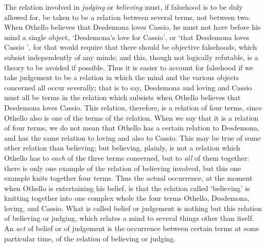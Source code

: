 \documentclass[oneside,letterpaper,12pt]{book}
\begin{document}
The relation involved in \emph{judging} or \emph{believing} must, if
falsehood is to be duly allowed for, be taken to be a relation between
several terms, not between two. When Othello believes that Desdemona
loves Cassio, he must not have before his mind a single object,
`Desdemona's love for
Cassio', or `that Desdemona loves Cassio
', for that would require that there should be objective
falsehoods, which subsist independently of any minds; and this, though
not logically refutable, is a theory to be avoided if possible. Thus it
is easier to account for falsehood if we take judgement to be a relation
in which the mind and the various objects concerned all occur severally;
that is to say, Desdemona and loving and Cassio must all be terms in the
relation which subsists when Othello believes that Desdemona loves
Cassio. This relation, therefore, is a relation of four terms, since
Othello also is one of the terms of the relation. When we say that it is
a relation of four terms, we do not mean that Othello has a certain
relation to Desdemona, and has the same relation to loving and also to
Cassio. This may be true of some other relation than believing; but
believing, plainly, is not a relation which Othello has to \emph{each}
of the three terms concerned, but to \emph{all} of them together: there
is only one example of the relation of believing involved, but this one
example knits together four terms. Thus the actual occurrence, at the
moment when Othello is entertaining his belief, is that the relation
called `believing' is knitting together
into one complex whole the four terms Othello, Desdemona, loving, and
Cassio. \label{weaving} What is called belief or judgement is nothing but this relation
of believing or judging, which relates a mind to several things other
than itself. An \emph{act} of belief or of judgement is the occurrence
between certain terms at some particular time, of the relation of
believing or judging.
\end{document}
